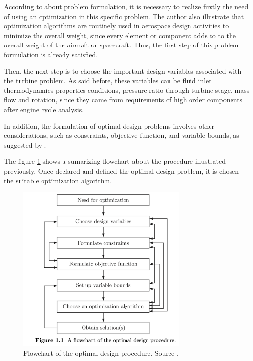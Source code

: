 According to \cite{Deb2012} about problem formulation, it is necessary to realize firstly the need of using an optimization in this specific problem. The author also illustrate that optimization algorithms are routinely used in aerospace design activities to minimize the overall weight, since every element or component adds to to the overall weight of the aircraft or spacecraft. Thus, the first step of this problem formulation is already satisfied.

Then, the next step is to choose the important design variables associated with the turbine problem. As said before, these variables can be fluid inlet thermodynamics properties conditions, pressure ratio through turbine stage, mass flow and rotation, since they came from requirements of high order components after engine cycle analysis.

In addition, the formulation of optimal design problems involves other considerations, such as constraints, objective function, and variable bounds, as suggested by \cite{Deb2012}.

The figure \ref{fig:od_flowchart} shows a sumarizing flowchart about the procedure illustrated previously. Once declared and defined the optimal design problem, it is chosen the suitable optimization algorithm.

\begin{figure}[h]
    \centering
    \includegraphics[width=0.75\textwidth]{Cap3/od_flowchart.png}
    \caption{Flowchart of the optimal design procedure. Source \cite{Deb2012}.}
    \label{fig:od_flowchart}
\end{figure}

